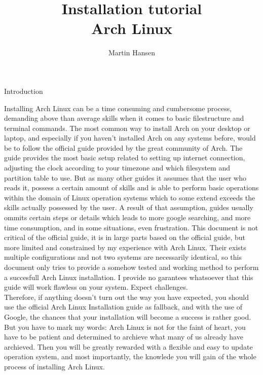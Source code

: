\documentclass{article}
\title{Installation tutorial \\ \small Arch Linux}
\author{Martin Hansen}
\begin{document}
	\frenchspacing
	\ttfamily
	
	\maketitle
	\pagebreak
	\begin{center}
		\Large Introduction
	\end{center}
	
	Installing Arch Linux can be a time consuming and cumbersome process, demanding above than average skills when it comes to basic filestructure and terminal commands. The most common way to install Arch on your desktop or laptop, and especially if you haven't installed Arch on any systems before, would be to follow the official guide provided by the great community of Arch. The guide provides the most basic setup related to setting up internet connection, adjusting the clock according to your timezone and which filesystem and partition table to use. But as many other guides it assumes that the user who reads it, possess a certain amount of skills and is able to perform basic operations within the domain of Linux operation systems which to some extend exceeds the skills actually possessed by the user. A result of that assumption, guides usually ommits certain steps or details which leads to more google searching, and more time consumption, and in some situations, even frustration. This document is not critical of the official guide, it is in large parts based on the official guide, but more limited and constrained by my experience with Arch Linux. Their exists multiple configurations and not two systems are necessarily identical, so this document only tries to provide a somehow tested and working method to perform a succesfull Arch Linux installation. I provide no garantees whatsoever that this guide will work flawless on your system. Expect challenges.\\
	
	Therefore, if anything doesn't turn out the way you have expected, you should use the official Arch Linux Installation guide as fallback, and with the use of Google, the chances that your installation will become a success is rather good. But you have to mark my words: Arch Linux is not for the faint of heart, you have to be patient and determined to archieve what many of us already have archieved. Then you will be greatly rewarded with a flexible and easy to update operation system, and most importantly, the knowlede you will gain of the whole process of installing Arch Linux.\\
	
\end{document}
